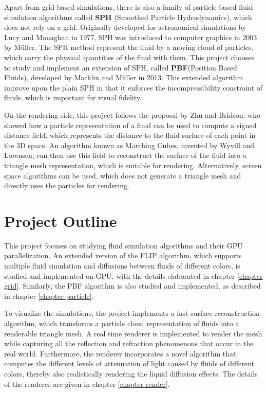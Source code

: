Apart from grid-based simulations, there is also a family of particle-based fluid simulation algorithms called \textbf{SPH} (Smoothed Particle Hydrodynamics), which does not rely on a grid. Originally developed for astronomical simulations by Lucy\cite{lucy1977numerical} and Monaghan \cite{monaghan1992smoothed} in 1977, SPH was introduced to computer graphics in 2003 by Müller\cite{muller2003particle}. The SPH method represent the fluid by a moving cloud of particles, which carry the physical quantities of the fluid with them. This project chooses to study and implement an extension of SPH, called \textbf{PBF}(Position Based Fluids), developed by Macklin and Müller\cite{macklin2013position} in 2013. This extended algorithm improve upon the plain SPH in that it enforces the incompressibility constraint of fluids, which is important for visual fidelity. 


On the rendering side, this project follows the proposal by Zhu and Bridson\cite{zhu2005animating}, who showed how a particle representation of a fluid can be used to compute a signed distance field, which represents the distance to the fluid surface of each point in the 3D space. An algorithm known as Marching Cubes, invented by Wyvill\cite{wyvill1986soft} and Lorensen\cite{lorensen1987marching}, can then use this field to reconstruct the surface of the fluid into a triangle mesh representation, which is suitable for rendering. Alternatively, screen space algorithms\cite{van2009screen} can be used, which does not generate a triangle mesh and directly uses the particles for rendering.



\section{Project Outline}


This project focuses on studying fluid simulation algorithms and their GPU parallelization. An extended version of the FLIP algorithm, which supports multiple fluid simulation and diffusions between fluids of different colors, is studied and implemented on GPU, with the details elaborated in chapter \ref{chapter grid}. Similarly, the PBF algorithm is also studied and implemented, as described in chapter \ref{chapter particle}. 

To visualize the simulations, the project implements a fast surface reconstruction algorithm, which transforms a particle cloud representation of fluids into a renderable triangle mesh. A real time renderer is implemented to render the mesh while capturing all the reflection and refraction phenomenons that occur in the real world. Furthermore, the renderer incorporates a novel algorithm that computes the different levels of attenuation of light caused by fluids of different colors, thereby also realistically rendering the liquid diffusion effects. The details of the renderer are given in chapter \ref{chapter render}.

